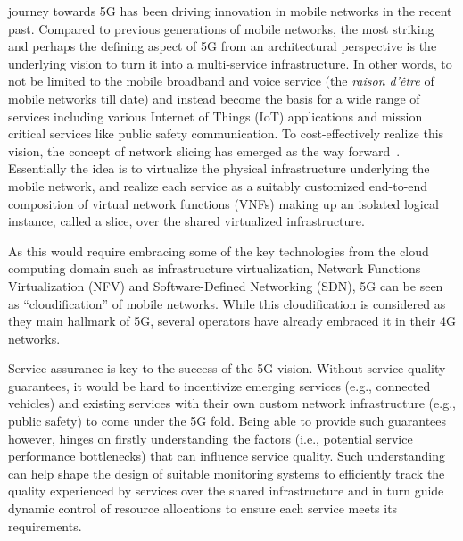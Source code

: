 \documentclass[journal,comsoc]{IEEEtran}
\begin{document}
%
 journey towards 5G has been driving innovation in mobile networks in the recent past. 
Compared to previous generations of mobile networks, the most striking and perhaps the defining aspect of 5G from an architectural perspective is the underlying vision to turn it into a multi-service infrastructure. 
In other words, to not be limited to the mobile broadband and voice service (the {\em raison d'\^etre} of mobile networks till date) and instead become the basis for a wide range of services including various Internet of Things (IoT) applications and mission critical services like public safety communication.
To cost-effectively realize this vision, the concept of network slicing has emerged as the way forward~\cite{5gppp}. 
Essentially the idea is to virtualize the physical infrastructure underlying the mobile network, and realize each service as a suitably customized end-to-end composition of virtual network functions (VNFs) making up an isolated logical instance, called a slice, over the shared virtualized infrastructure. 

As this would require embracing some of the key technologies from the cloud computing domain such as infrastructure virtualization, Network Functions Virtualization (NFV) and Software-Defined Networking (SDN), 5G can be seen as ``cloudification'' of mobile networks.
While this cloudification is considered as they main hallmark of 5G, several operators have already embraced it in their 4G networks.


%
Service assurance is key to the success of the 5G vision. Without service quality guarantees, it would be hard to incentivize emerging services (e.g., connected vehicles) and existing services with their own custom network infrastructure (e.g., public safety) to come under the 5G fold. 
Being able to provide such guarantees however, hinges on firstly understanding the factors (i.e., potential service performance bottlenecks) that can influence service quality. 
Such understanding can help shape the design of suitable monitoring systems to efficiently track the quality experienced by services over the shared infrastructure and in turn guide dynamic control of resource allocations to ensure each service meets its requirements. 
\end{document}

